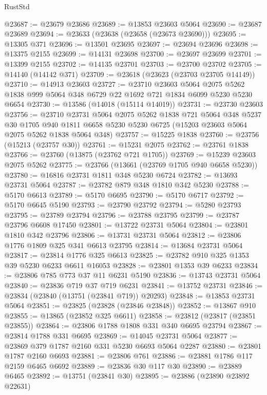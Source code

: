 \begin{lexlean}{RustStd}
\begin{coremodule}
@23687 := @23679 @23686
@23689 := @13853 @23603 @5064
@23690 := @23687 @23689
@23694 := @23633 (@23638 (@23658 (@23673 @23690)))
@23695 := @13305 @371
@23696 := @13501 @23695
@23697 := @23694 @23696
@23698 := @13375 @2155
@23699 := @14131 @23698
@23700 := @23697 @23699
@23701 := @13399 @2155
@23702 := @14135 @23701
@23703 := @23700 @23702
@23705 := @14140 (@14142 @371)
@23709 := @23618 (@23623 (@23703 @23705 @14149))
@23710 := @14913 @23603
@23727 := @23710
    @23603
    @5064
    @2075
    @5262
    @1838
    @999
    @5064
    @348
    @6729
    @22
    @1692
    @721
    @1834
    @6099
    @5230
    @5230
    @6654
@23730 := @13586 (@14018 (@15114 @14019))
@23731 := @23730 @23603
@23756 := @23710
    @23731
    @5064
    @2075
    @5262
    @1838
    @721
    @5064
    @348
    @5237
    @30
    @1705
    @940
    @1811
    @6658
    @5230
    @5230
    @6725
    (@15203 @23603 @5064 @2075 @5262 @1838 @5064 @348)
@23757 := @15225 @1838
@23760 := @23756 (@15213 (@23757 @30))
@23761 := @15231 @2075
@23762 := @23761 @1838
@23766 := @23760 (@13875 (@23762 @721 @1705))
@23769 := @15239 @23603 @2075 @5262
@23775 := @23766 (@13661 (@23769 @1705 @940 @6658 @5230))
@23780 := @16816 @23731 @1811 @348 @5230 @6724
@23782 := @13693 @23731 @5064
@23787 := @23782 @879 @348 @1810 @342 @5230
@23788 := @5170 @6613
@23789 := @5170 @6695
@23790 := @5170 @6717
@23792 := @5170 @6645 @5190
@23793 := @23790 @23792
@23794 := @5280 @23793
@23795 := @23789 @23794
@23796 := @23788 @23795
@23799 := @23787 @23796 @6608 @17450
@23801 := @13722 @23731 @5064
@23804 := @23801 @1810 @342 @23796
@23806 := @13731 @23731 @5064
@23812 := @23806 @1776 @1809 @325 @341 @6613 @23795
@23814 := @13684 @23731 @5064
@23817 := @23814 @1776 @325 @6613
@23825 := @23782 @910 @325 @1353 @39 @5230 @6233 @6611 @16053
@23828 := @23801 @1353 @39 @6233
@23834 := @23806 @785 @773 @37 @11 @6231 @5190
@23836 := @13743 @23731 @5064
@23840 := @23836 @719 @37 @719 @6231
@23841 := @13752 @23731
@23846 := @23834 (@23840 (@13751 (@23841 @719)) @20293)
@23848 := @13853 @23731 @5064
@23851 := @23825 (@23828 (@23846 @23848))
@23852 := @13867 @910
@23855 := @13865 (@23852 @325 @6611)
@23858 := @23812 (@23817 (@23851 @23855))
@23864 := @23806 @1788 @1808 @331 @340 @6695 @23794
@23867 := @23814 @1788 @331 @6695
@23869 := @14045 @23731 @5064
@23877 := @23869 @379 @1787 @2160 @331 @5230 @6693 @5064 @2287
@23880 := @23801 @1787 @2160 @6693
@23881 := @23806 @761
@23886 := @23881 @1786 @117 @2159 @6465 @6692
@23889 := @23836 @30 @117 @30
@23890 := @23889 @6465
@23892 := @13751 (@23841 @30)
@23895 := @23886 (@23890 @23892 @22631)

\end{coremodule}
\end{lexlean}
